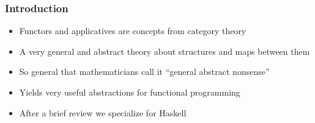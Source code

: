 \documentclass{beamer}
\subtitle
{Functors, Applicatives, and Parsers}
\begin{document}
\begin{frame}
  \titlepage
\end{frame}

\begin{frame}
  \frametitle{Introduction}
  \begin{itemize}
  \item Functors and applicatives are concepts from \alert{category
      theory}
  \item A very general and abstract theory about structures and maps between them
  \item So general that mathematicians call it ``general abstract
    nonsense''
  \item Yields very useful abstractions for functional programming
  \item After a brief review we specialize for Haskell
  \end{itemize}
\end{frame}
\end{document}
